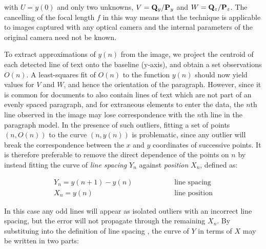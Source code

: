 { \parindent 0mm
with $U=y(0)$ and only two unknowns,
$V = {{ \bf Q }_y}/{{ \bf P }_y}$ and $W = {{ \bf Q }_z}/{{ \bf P }_z}$.
The cancelling of the focal length $f$ in this way means that the technique is applicable to images captured with any optical camera and the internal parameters of the original camera need not be known.

To extract approximations of $y(n)$ from the image, we project the centroid of each detected line of text onto the baseline (y-axis), and obtain a set observations $O(n)$.
A least-squares fit of $O(n)$ to the function $y(n)$ should now yield values for $V$ and $W$, and hence the orientation of the paragraph.
However, since it is common for documents to also contain lines of text which are not part of an evenly spaced paragraph, and for extraneous elements to enter the data, the $n$th line observed in the image may lose correspondence with the $n$th line in the paragraph model.
In the presence of such outliers, fitting a set of points $(n,O(n))$ to the curve $(n,y(n))$ 
is problematic, since any outlier will break the correspondence between the $x$
and $y$ coordinates of successive points.
It is therefore preferable to remove the direct dependence of the points on $n$
by instead fitting the curve of {\em line spacing} $Y_n$ against {\em position} $X_n$, defined as:

\begin{eqnarray}
Y_n = y(n+1)-y(n) & \mbox{~~~~~~~~~~~~~~~line spacing} \label{linespacingsdefneqn} \\
X_n = y(n) & \mbox{~~~~~~~~~~~~~~~line position} \label{linepositiondefneqn}
\end{eqnarray}

In this case any odd lines will appear as isolated outliers with an incorrect line spacing, but the error will not propagate through the remaining $X_n$. %
By substituing  into the definition of line spacing , the curve of $Y$ in terms of $X$ may be written in two parts:
}

